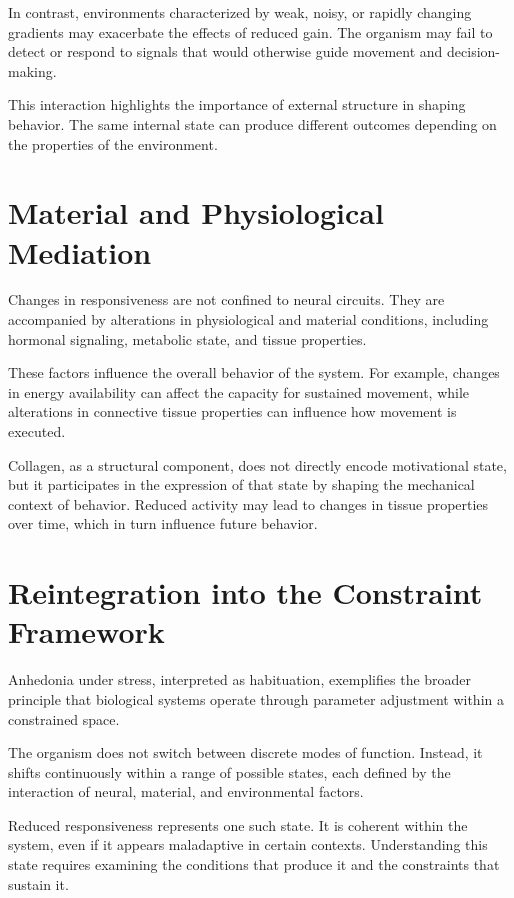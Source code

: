 \documentclass[11pt,oneside]{book}
\begin{document}
In contrast, environments characterized by weak, noisy, or rapidly changing gradients may exacerbate the effects of reduced gain. The organism may fail to detect or respond to signals that would otherwise guide movement and decision-making.

This interaction highlights the importance of external structure in shaping behavior. The same internal state can produce different outcomes depending on the properties of the environment.

\section{Material and Physiological Mediation}

Changes in responsiveness are not confined to neural circuits. They are accompanied by alterations in physiological and material conditions, including hormonal signaling, metabolic state, and tissue properties.

These factors influence the overall behavior of the system. For example, changes in energy availability can affect the capacity for sustained movement, while alterations in connective tissue properties can influence how movement is executed.

Collagen, as a structural component, does not directly encode motivational state, but it participates in the expression of that state by shaping the mechanical context of behavior. Reduced activity may lead to changes in tissue properties over time, which in turn influence future behavior.

\section{Reintegration into the Constraint Framework}

Anhedonia under stress, interpreted as habituation, exemplifies the broader principle that biological systems operate through parameter adjustment within a constrained space.

The organism does not switch between discrete modes of function. Instead, it shifts continuously within a range of possible states, each defined by the interaction of neural, material, and environmental factors.

Reduced responsiveness represents one such state. It is coherent within the system, even if it appears maladaptive in certain contexts. Understanding this state requires examining the conditions that produce it and the constraints that sustain it.
\end{document}
